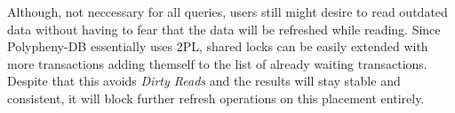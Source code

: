 

Although, not neccessary for all queries, users still might desire to read outdated data without having to fear that the data will be refreshed while reading.
Since Polypheny-DB essentially uses 2PL, shared locks can be easily extended with more transactions adding themself to the list of already waiting transactions.
Despite that this avoids \emph{Dirty Reads} and the results will stay stable and consistent, it will block further refresh operations on this placement entirely. 

